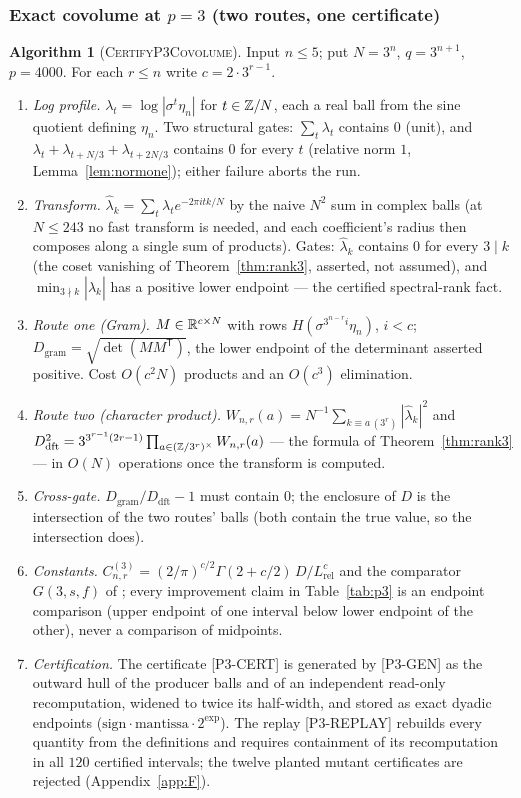 \documentclass[11pt]{amsart}
\theoremstyle{remark}\newtheorem{remark}[theorem]{Remark}
\theoremstyle{definition}\newtheorem{definition}[theorem]{Definition}
\theoremstyle{definition}\newtheorem{algorithm}[theorem]{Algorithm}
\newcommand{\artPcert}{[P3-CERT]}\newcommand{\artPgen}{[P3-GEN]}\newcommand{\artPreplay}{[P3-REPLAY]}\newcommand{\artPcover}{[P3-COVER]}\newcommand{\artPcheck}{[P3-CHECK]}\newcommand{\artNovelty}{[NOVELTY]}
\begin{document}
\subsubsection*{Exact covolume at $p=3$ (two routes, one certificate)}
\begin{algorithm}[\textsc{CertifyP3Covolume}]\label{alg:p3}
Input $n\le5$; put $N=3^n$, $q=3^{n+1}$, $p=4000$. For each $r\le n$ write $c=2\cdot3^{r-1}$.
\begin{enumerate}
\item[(1)] \emph{Log profile.} $\lambda_t=\log|\sigma^t\eta_n|$ for $t\in\mathbb{Z}/N$, each a real ball from the sine quotient defining $\eta_n$. Two structural gates: $\sum_t\lambda_t$ contains $0$ (unit), and $\lambda_t+\lambda_{t+N/3}+\lambda_{t+2N/3}$ contains $0$ for every $t$ (relative norm $1$, Lemma~\ref{lem:normone}); either failure aborts the run.
\item[(2)] \emph{Transform.} $\hat\lambda_k=\sum_t\lambda_t e^{-2\pi itk/N}$ by the naive $N^2$ sum in complex balls (at $N\le243$ no fast transform is needed, and each coefficient's radius then composes along a single sum of products). Gates: $\hat\lambda_k$ contains $0$ for every $3\mid k$ (the coset vanishing of Theorem~\ref{thm:rank3}, asserted, not assumed), and $\min_{3\nmid k}|\hat\lambda_k|$ has a positive lower endpoint --- the certified spectral-rank fact.
\item[(3)] \emph{Route one (Gram).} $M\in\mathbb{R}^{c\times N}$ with rows $H(\sigma^{3^{n-r}i}\eta_n)$, $i<c$; $D_{\mathrm{gram}}=\sqrt{\det(MM^{\mathsf T})}$, the lower endpoint of the determinant asserted positive. Cost $O(c^2N)$ products and an $O(c^3)$ elimination.
\item[(4)] \emph{Route two (character product).} $W_{n,r}(a)=N^{-1}\sum_{k\equiv a\,(3^r)}|\hat\lambda_k|^2$ and $D_{\mathrm{dft}}^2=3^{3^{r-1}(2r-1)}\prod_{a\in(\mathbb{Z}/3^r)^\times}W_{n,r}(a)$ --- the formula of Theorem~\ref{thm:rank3} --- in $O(N)$ operations once the transform is computed.
\item[(5)] \emph{Cross-gate.} $D_{\mathrm{gram}}/D_{\mathrm{dft}}-1$ must contain $0$; the enclosure of $D$ is the intersection of the two routes' balls (both contain the true value, so the intersection does).
\item[(6)] \emph{Constants.} $C^{(3)}_{n,r}=(2/\pi)^{c/2}\Gamma(2+c/2)\,D/L^{c}_{\mathrm{rel}}$ and the comparator $G(3,s,f)$ of \cite{MO16}; every improvement claim in Table~\ref{tab:p3} is an endpoint comparison (upper endpoint of one interval below lower endpoint of the other), never a comparison of midpoints.
\item[(7)] \emph{Certification.} The certificate \artPcert{} is generated by \artPgen{} as the outward hull of the producer balls and of an independent read-only recomputation, widened to twice its half-width, and stored as exact dyadic endpoints ($\mathrm{sign}\cdot\mathrm{mantissa}\cdot2^{\mathrm{exp}}$). The replay \artPreplay{} rebuilds every quantity from the definitions and requires containment of its recomputation in all $120$ certified intervals; the twelve planted mutant certificates are rejected (Appendix~\ref{app:F}).
\end{enumerate}
\end{algorithm}
\end{document}
